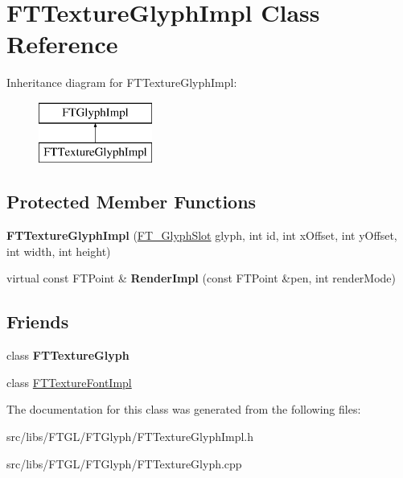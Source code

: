 \hypertarget{class_f_t_texture_glyph_impl}{
\section{FTTextureGlyphImpl Class Reference}
\label{class_f_t_texture_glyph_impl}
}
Inheritance diagram for FTTextureGlyphImpl:\begin{figure}[H]
\begin{center}
\leavevmode
\includegraphics[height=2.000000cm]{class_f_t_texture_glyph_impl}
\end{center}
\end{figure}
\subsection*{Protected Member Functions}
\begin{DoxyCompactItemize}
\item 
\hypertarget{class_f_t_texture_glyph_impl_a63893590c3c3c45da5f3925ae9a97abd}{
{\bfseries FTTextureGlyphImpl} (\hyperlink{struct_f_t___glyph_slot_rec__}{FT\_\-GlyphSlot} glyph, int id, int xOffset, int yOffset, int width, int height)}
\label{class_f_t_texture_glyph_impl_a63893590c3c3c45da5f3925ae9a97abd}

\item 
\hypertarget{class_f_t_texture_glyph_impl_a3fce2bf9435946ae0f8ee5eacbe7f702}{
virtual const FTPoint \& {\bfseries RenderImpl} (const FTPoint \&pen, int renderMode)}
\label{class_f_t_texture_glyph_impl_a3fce2bf9435946ae0f8ee5eacbe7f702}

\end{DoxyCompactItemize}
\subsection*{Friends}
\begin{DoxyCompactItemize}
\item 
\hypertarget{class_f_t_texture_glyph_impl_a01c2ee1e01ccd33e4f1f26f2478a74a0}{
class {\bfseries FTTextureGlyph}}
\label{class_f_t_texture_glyph_impl_a01c2ee1e01ccd33e4f1f26f2478a74a0}

\item 
\hypertarget{class_f_t_texture_glyph_impl_a566181ddfc0f1c50d2ff9fd4160a0ff5}{
class \hyperlink{class_f_t_texture_glyph_impl_a566181ddfc0f1c50d2ff9fd4160a0ff5}{FTTextureFontImpl}}
\label{class_f_t_texture_glyph_impl_a566181ddfc0f1c50d2ff9fd4160a0ff5}

\end{DoxyCompactItemize}


The documentation for this class was generated from the following files:\begin{DoxyCompactItemize}
\item 
src/libs/FTGL/FTGlyph/FTTextureGlyphImpl.h\item 
src/libs/FTGL/FTGlyph/FTTextureGlyph.cpp\end{DoxyCompactItemize}
